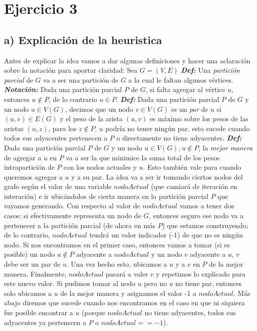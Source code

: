 \documentclass[a4paper]{article}
\begin{document}
\section{Ejercicio 3}
\subsection*{a) Explicación de la heuristica}
Antes de explicar la idea vamos a dar algunas definiciones y hacer una aclaración sobre la notación para aportar claridad:
\newline Sea $G = (V, E)$
\newline \textit{\textbf{Def:}} Una \textit{partición parcial} de $G$ va a ser una partición de $G$ a la cual le faltan algunos vértices.
\newline \textit{\textbf{Notación: }} Dada una partición parcial $P$ de $G$, si falta agregar al vértice $u$, entonces $u \notin P$, de lo contrario $u \in P$.
\newline \textit{\textbf{Def:}} Dada una partición parcial $P$ de $G$ y un nodo $u \in V(G)$, decimos que un nodo $v \in V(G)$ es un \textit{par} de $u$ si $(u, v) \in E(G)$ y el peso de la arista $(u, v)$ es máximo sobre los pesos de las aristas $(u, z)$, para los $z \notin P$. $u$ podría no tener ningún par, esto sucede cuando todos sus adyacentes pertenecen a $P$ o directamente no tiene adyacentes.
\newline \textit{\textbf{Def:}} Dada una partición parcial $P$ de $G$ y un nodo $u \in V(G), u \notin P$, la \textit{mejor manera} de agregar a $u$ en $P$ va a ser la que minimice la suma total de los pesos intrapartición de $P$ con los nodos actuales y $u$. Esto también vale para cuando queremos agregar a $u$ y a su par.
\newline
\newline
La idea va a ser ir tomando ciertos nodos del grafo según el valor de una variable $nodoActual$ (que camiará de iteración en interación) e ir ubicándolos de cierta manera en la partición parcial $P$ que vayamos generando. Con respecto al valor de $nodoActual$ vamos a tener dos casos: si efectivamente representa un nodo de $G$, entonces seguro ese nodo va a pertenecer a la partición parcial (de ahora en más $P$) que estamos construyendo; de lo contrario,  $nodoActual$ tendrá un valor indicador (-1) de que no es ningún nodo. 
\newline Si nos encontramos en el primer caso, entonces vamos a tomar (si es posible) un nodo $u \notin P$ adyacente a $nodoActual$ y un nodo $v$ adyacente a $u$, $v$ debe ser un par de $u$. Una vez hecho esto, ubicamos a $u$ y a $v$ en $P$ de la mejor manera. Finalmente, $nodoActual$ pasará a valer $v$ y repetimos lo explicado para este nuevo valor. Si pudimos tomar al nodo $u$ pero no $u$ no tiene par, entonces solo ubicamos a $u$ de la mejor manera y asignamos el valor -1 a $nodoActual$. Más abajo diremos que sucede cuando nos encontramos en el caso en que ni siquiera fue posible encontrar a $u$ (porque $nodoActual$ no tiene adyacentes, todos sus adyacentes ya pertenecen a $P$ o $nodoActual == -1$).
\end{document}
